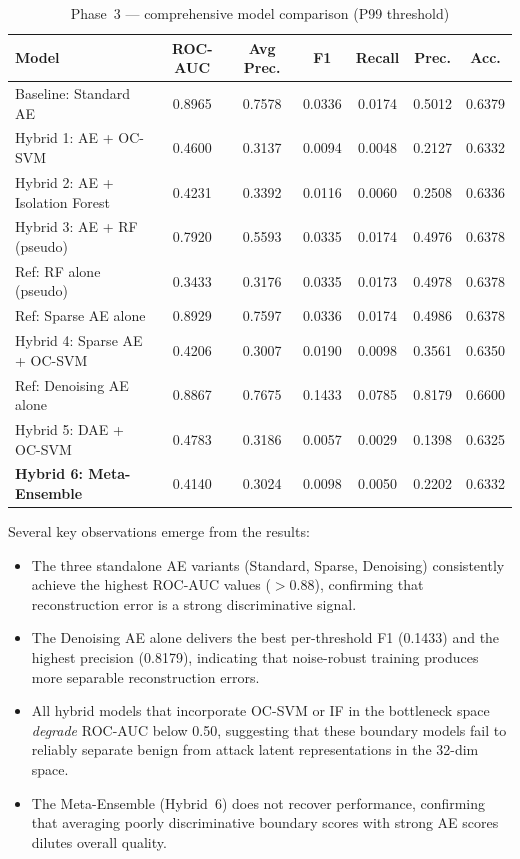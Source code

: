\documentclass[10pt,conference]{IEEEtran}
\begin{document}
\begin{table}[htbp]
\centering
\caption{Phase~3 — comprehensive model comparison (P99 threshold)}
\label{tab:comparison}
\begin{tabular}{lcccccc}
\toprule
\textbf{Model} & \textbf{ROC-AUC} & \textbf{Avg Prec.} & \textbf{F1} & \textbf{Recall} & \textbf{Prec.} & \textbf{Acc.} \\
\midrule
Baseline: Standard AE          & 0.8965 & 0.7578 & 0.0336 & 0.0174 & 0.5012 & 0.6379 \\
Hybrid 1: AE + OC-SVM          & 0.4600 & 0.3137 & 0.0094 & 0.0048 & 0.2127 & 0.6332 \\
Hybrid 2: AE + Isolation Forest & 0.4231 & 0.3392 & 0.0116 & 0.0060 & 0.2508 & 0.6336 \\
Hybrid 3: AE + RF (pseudo)     & 0.7920 & 0.5593 & 0.0335 & 0.0174 & 0.4976 & 0.6378 \\
Ref: RF alone (pseudo)          & 0.3433 & 0.3176 & 0.0335 & 0.0173 & 0.4978 & 0.6378 \\
Ref: Sparse AE alone            & 0.8929 & 0.7597 & 0.0336 & 0.0174 & 0.4986 & 0.6378 \\
Hybrid 4: Sparse AE + OC-SVM   & 0.4206 & 0.3007 & 0.0190 & 0.0098 & 0.3561 & 0.6350 \\
Ref: Denoising AE alone         & 0.8867 & 0.7675 & 0.1433 & 0.0785 & 0.8179 & 0.6600 \\
Hybrid 5: DAE + OC-SVM          & 0.4783 & 0.3186 & 0.0057 & 0.0029 & 0.1398 & 0.6325 \\
\textbf{Hybrid 6: Meta-Ensemble} & 0.4140 & 0.3024 & 0.0098 & 0.0050 & 0.2202 & 0.6332 \\
\bottomrule
\end{tabular}
\end{table}

Several key observations emerge from the results:

\begin{itemize}[leftmargin=*,noitemsep]
  \item The three standalone AE variants (Standard, Sparse, Denoising)
        consistently achieve the highest ROC-AUC values ($>0.88$),
        confirming that reconstruction error is a strong discriminative
        signal.
  \item The Denoising AE alone delivers the best per-threshold F1
        (0.1433) and the highest precision (0.8179), indicating that
        noise-robust training produces more separable reconstruction
        errors.
  \item All hybrid models that incorporate OC-SVM or IF in the
        bottleneck space \emph{degrade} ROC-AUC below 0.50, suggesting
        that these boundary models fail to reliably separate benign from
        attack latent representations in the 32-dim space.
  \item The Meta-Ensemble (Hybrid~6) does not recover performance,
        confirming that averaging poorly discriminative boundary scores
        with strong AE scores dilutes overall quality.
\end{itemize}
\end{document}

